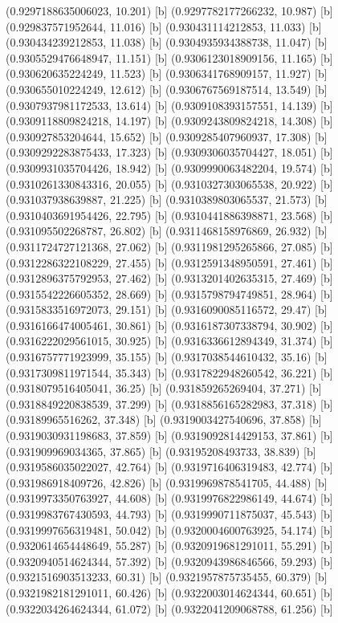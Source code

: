 {{{(0.9297188635006023, 10.201) [b] 
(0.9297782177266232, 10.987) [b] 
(0.929837571952644, 11.016) [b] 
(0.930431114212853, 11.033) [b] 
(0.930434239212853, 11.038) [b] 
(0.9304935934388738, 11.047) [b] 
(0.9305529476648947, 11.151) [b] 
(0.9306123018909156, 11.165) [b] 
(0.930620635224249, 11.523) [b] 
(0.9306341768909157, 11.927) [b] 
(0.930655010224249, 12.612) [b] 
(0.9306767569187514, 13.549) [b] 
(0.9307937981172533, 13.614) [b] 
(0.9309108393157551, 14.139) [b] 
(0.9309118809824218, 14.197) [b] 
(0.9309243809824218, 14.308) [b] 
(0.930927853204644, 15.652) [b] 
(0.9309285407960937, 17.308) [b] 
(0.9309292283875433, 17.323) [b] 
(0.9309306035704427, 18.051) [b] 
(0.9309931035704426, 18.942) [b] 
(0.9309990063482204, 19.574) [b] 
(0.9310261330843316, 20.055) [b] 
(0.9310327303065538, 20.922) [b] 
(0.931037938639887, 21.225) [b] 
(0.9310389803065537, 21.573) [b] 
(0.9310403691954426, 22.795) [b] 
(0.9310441886398871, 23.568) [b] 
(0.931095502268787, 26.802) [b] 
(0.9311468158976869, 26.932) [b] 
(0.9311724727121368, 27.062) [b] 
(0.9311981295265866, 27.085) [b] 
(0.9312286322108229, 27.455) [b] 
(0.9312591348950591, 27.461) [b] 
(0.9312896375792953, 27.462) [b] 
(0.9313201402635315, 27.469) [b] 
(0.9315542226605352, 28.669) [b] 
(0.9315798794749851, 28.964) [b] 
(0.9315833516972073, 29.151) [b] 
(0.9316090085116572, 29.47) [b] 
(0.9316166474005461, 30.861) [b] 
(0.9316187307338794, 30.902) [b] 
(0.9316222029561015, 30.925) [b] 
(0.9316336612894349, 31.374) [b] 
(0.9316757771923999, 35.155) [b] 
(0.9317038544610432, 35.16) [b] 
(0.9317309811971544, 35.343) [b] 
(0.9317822948260542, 36.221) [b] 
(0.9318079516405041, 36.25) [b] 
(0.931859265269404, 37.271) [b] 
(0.9318849220838539, 37.299) [b] 
(0.9318856165282983, 37.318) [b] 
(0.93189965516262, 37.348) [b] 
(0.9319003427540696, 37.858) [b] 
(0.9319030931198683, 37.859) [b] 
(0.9319092814429153, 37.861) [b] 
(0.931909969034365, 37.865) [b] 
(0.93195208493733, 38.839) [b] 
(0.9319586035022027, 42.764) [b] 
(0.9319716406319483, 42.774) [b] 
(0.931986918409726, 42.826) [b] 
(0.9319969878541705, 44.488) [b] 
(0.9319973350763927, 44.608) [b] 
(0.9319976822986149, 44.674) [b] 
(0.9319983767430593, 44.793) [b] 
(0.9319990711875037, 45.543) [b] 
(0.9319997656319481, 50.042) [b] 
(0.9320004600763925, 54.174) [b] 
(0.9320614654448649, 55.287) [b] 
(0.9320919681291011, 55.291) [b] 
(0.9320940514624344, 57.392) [b] 
(0.9320943986846566, 59.293) [b] 
(0.9321516903513233, 60.31) [b] 
(0.9321957875735455, 60.379) [b] 
(0.9321982181291011, 60.426) [b] 
(0.9322003014624344, 60.651) [b] 
(0.9322034264624344, 61.072) [b] 
(0.9322041209068788, 61.256) [b] 
}}}
